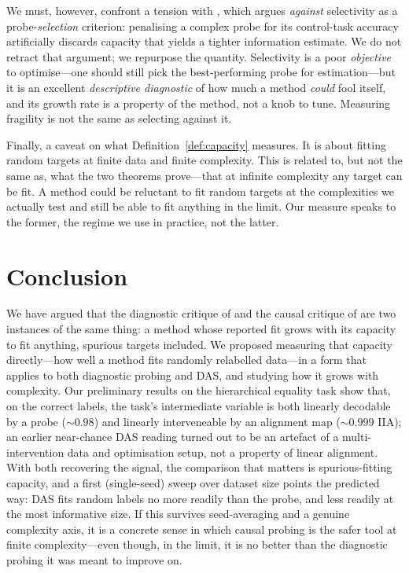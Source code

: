 \documentclass[11pt]{article}
\begin{document}
We must, however, confront a tension with \citet{pimentel2020information}, which
argues \emph{against} selectivity as a probe-\emph{selection} criterion: penalising
a complex probe for its control-task accuracy artificially discards capacity that
yields a tighter information estimate. We do not retract that argument; we
repurpose the quantity. Selectivity is a poor \emph{objective} to optimise---one
should still pick the best-performing probe for estimation---but it is an excellent
\emph{descriptive diagnostic} of how much a method \emph{could} fool itself, and
its growth rate is a property of the method, not a knob to tune. Measuring
fragility is not the same as selecting against it.

Finally, a caveat on what Definition~\ref{def:capacity} measures. It is about fitting random
targets at finite data and finite complexity. This is related to, but not the same
as, what the two theorems prove---that at infinite complexity any target can be fit.
A method could be reluctant to fit random targets at the complexities we actually
test and still be able to fit anything in the limit. Our measure speaks to the
former, the regime we use in practice, not the latter.

\section{Conclusion}\label{sec:conclusion}

We have argued that the diagnostic critique of \citet{pimentel2020information} and
the causal critique of \citet{sutter2025nonlinear} are two instances of the same
thing: a method whose reported fit grows with its capacity to fit anything, spurious
targets included. We proposed measuring that capacity directly---how well a method
fits randomly relabelled data---in a form that applies to both diagnostic probing and
DAS, and studying how it grows with complexity. Our preliminary results on the
hierarchical equality task show that, on the correct labels, the task's intermediate
variable is both linearly decodable by a probe ($\sim\!0.98$) and linearly
interveneable by an alignment map ($\sim\!0.999$ IIA); an earlier near-chance DAS
reading turned out to be an artefact of a multi-intervention data and optimisation
setup, not a property of linear alignment. With both recovering the signal, the comparison
that matters is spurious-fitting capacity, and a first (single-seed) sweep over dataset
size points the predicted way: DAS fits random labels no more readily than the probe,
and less readily at the most informative size. If this survives seed-averaging and a
genuine complexity axis, it is a concrete sense in which causal probing is the safer
tool at finite complexity---even though, in the limit, it is no better than the
diagnostic probing it was meant to improve on.

\small


\end{document}
